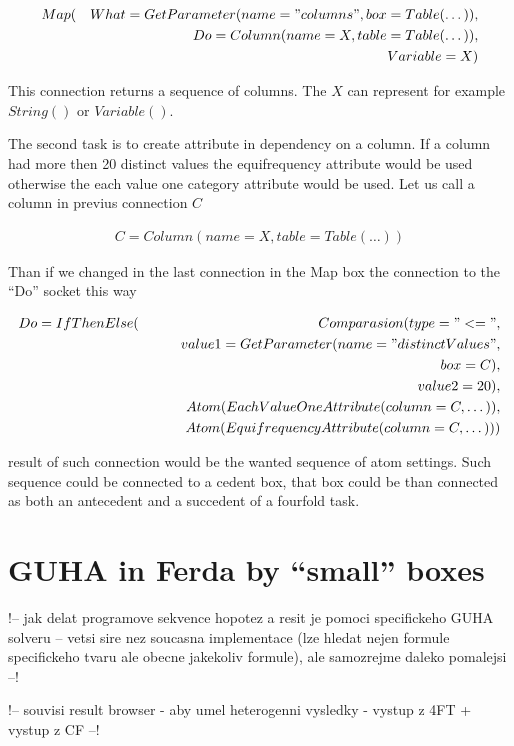\documentclass[a4paper,12pt]{book}
\begin{document}
\begin{eqnarray*}
Map(&&What=GetParameter(name="columns", box=Table(\dots)), \\&& Do=Column(name=X, table=Table(\dots)), \\&& Variable=X)
\end{eqnarray*}

This connection returns a sequence of columns. The $X$ can represent for example $String()$ or $Variable()$.

The second task is to create attribute in dependency on a column. If a column had more then 20 distinct values the equifrequency attribute would be used otherwise the each value one category attribute would be used. Let us call a column in previus connection $C$

\begin{eqnarray*}
C=Column(name=X, table=Table(\dots))
\end{eqnarray*}

Than if we changed in the last connection in the Map box the connection to the ``Do'' socket this way

\begin{eqnarray*}
Do=IfThenElse(&&Comparasion(type="<=", \\&&\qquad value1=GetParameter(name="distinctValues", \\&&\qquad\qquad box=C), \\&&\qquad value2=20),\\&&Atom(EachValueOneAttribute(column=C,\dots)),\\&&Atom(EquifrequencyAttribute(column=C,\dots)))
\end{eqnarray*}

result of such connection would be the wanted sequence of atom settings. Such sequence could be connected to a cedent box, that box could be than connected as both an antecedent and a succedent of a fourfold task.

\section{GUHA in Ferda by ``small'' boxes}
!-- jak delat programove sekvence hopotez a resit je pomoci specifickeho GUHA solveru -- vetsi sire nez soucasna implementace (lze hledat nejen formule specifickeho tvaru ale obecne jakekoliv formule), ale samozrejme daleko pomalejsi --!

!-- souvisi result browser - aby umel heterogenni vysledky - vystup z 4FT + vystup z CF --!
\end{document}
